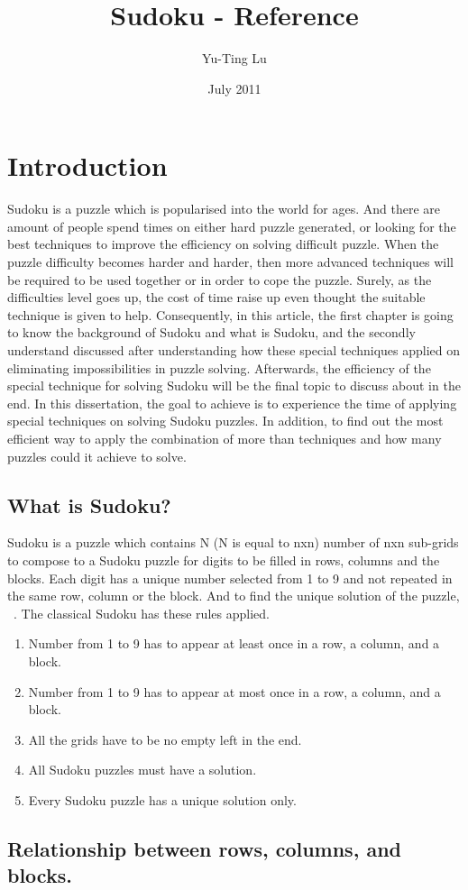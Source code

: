 \documentclass[11pt]{report}
\begin{document}
\title{Sudoku - Reference}
\author{Yu-Ting Lu}
\date{July 2011}
\maketitle

\tableofcontents

\chapter{Introduction}
\label{cha:Introduction}


Sudoku is a puzzle which is popularised into the world for ages. And there are amount of people spend times on either hard puzzle generated, or looking for the best techniques to improve the efficiency on solving difficult puzzle.
When the puzzle difficulty becomes harder and harder, then more advanced techniques will be required to be used together or in order to cope the puzzle. Surely, as the difficulties level goes up, the cost of time raise up even thought the suitable technique is given to help. Consequently, in this article, the first chapter is going to know the background of Sudoku and what is Sudoku, and the secondly understand discussed after understanding how these special techniques applied on eliminating impossibilities in puzzle solving. Afterwards, the efficiency of the special technique for solving Sudoku will be the final topic to discuss about in the end.
In this dissertation, the goal to achieve is to experience the time of applying special techniques on solving Sudoku puzzles. In addition, to find out the most efficient way to apply the combination of more than techniques and how many puzzles could it achieve to solve.


\section{What is Sudoku?}
\label{sec:whatissudoku}

Sudoku is a puzzle which contains N (N is equal to nxn) number of nxn sub-grids to compose to a Sudoku puzzle for digits to be filled in rows, columns and the blocks. Each digit has a unique number selected from 1 to 9 and not repeated in the same row, column or the block.
And to find the unique solution of the puzzle,  ~\cite{Berthier2007Sudoku}.
The classical Sudoku has these rules applied.
\begin{enumerate}
\item Number from 1 to 9 has to appear at least once in a row, a column, and a block.
\item Number from 1 to 9 has to appear at most once in a row, a column, and a block.
\item All the grids have to be no empty left in the end.
\item All Sudoku puzzles must have a solution.
\item Every Sudoku puzzle has a unique solution only.
\end{enumerate}


\section{Relationship between rows, columns, and blocks.}
\label{sec:Relationship}








\end{document}
